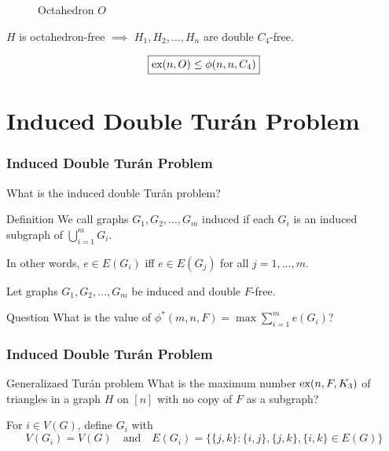 \documentclass{beamer}
\newcommand*{\ex}{\textnormal{ex}}
\begin{document}
\begin{frame}
{\begin{figure}
      \caption{Octahedron $O$}
    \end{figure}

    \begin{center}
      $H$ is octahedron-free $\implies$ $H_1, H_2, \ldots, H_n$ are double $C_4$-free.
    \end{center}
  
    \[
      \boxed{\ex(n, O) \leq \phi(n, n, C_4)}
    \]
  }
\end{frame}

\section{Induced Double Turán Problem}

\begin{frame}
  \frametitle{Induced Double Turán Problem}

  What is the \alert{induced} double Turán problem? \pause

  \begin{block}{Definition}
    We call graphs $G_1, G_2, \ldots, G_m$ \alert{induced} if each $G_i$ is an induced subgraph of $\bigcup_{i = 1}^m G_i$.
  \end{block}

  \pause

  In other words, $e \in E(G_i)$ iff $e \in E(G_j)$ for all $j = 1, \ldots, m$.

  \pause

  \vspace{0.5cm}

  Let graphs $G_1, G_2, \ldots, G_m$ be induced and double $F$-free.

  \begin{block}{Question}
    What is the value of $\phi^*(m, n, F) = \max \sum_{i = 1}^m e(G_i)$?
  \end{block}
\end{frame}

\begin{frame}
  \frametitle{Induced Double Turán Problem}

  \begin{block}{Generalizaed Turán problem}
    What is the maximum number $\ex(n, F, K_3)$ of triangles in a graph $H$ on $[n]$ with no copy of $F$ as a subgraph?
  \end{block}

  \pause 

  \vspace{0.5cm}

  For $i \in V(G)$, define $G_i$ with
  \[
    V(G_i) = V(G) \quad \text{and} \quad E(G_i) = \{\{j, k\} : \{i, j\}, \{j, k\}, \{i, k\} \in E(G)\}
  \]
\end{frame}
\end{document}
